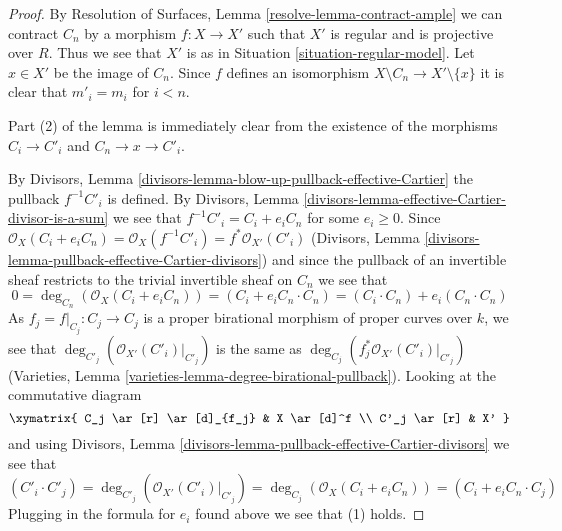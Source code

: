 \begin{proof}
By Resolution of Surfaces, Lemma \ref{resolve-lemma-contract-ample}
we can contract $C_n$ by a morphism $f : X \to X'$ such that $X'$ is
regular and is projective over $R$. Thus we see that $X'$ is as in
Situation \ref{situation-regular-model}.
Let $x \in X'$ be the image of $C_n$.
Since $f$ defines an isomorphism $X \setminus C_n \to X' \setminus \{x\}$
it is clear that $m'_i = m_i$ for $i < n$.

\medskip\noindent
Part (2) of the lemma is immediately clear from
the existence of the morphisms $C_i \to C'_i$ and $C_n \to x \to C'_i$.

\medskip\noindent
By Divisors, Lemma \ref{divisors-lemma-blow-up-pullback-effective-Cartier}
the pullback $f^{-1}C'_i$ is defined. By
Divisors, Lemma \ref{divisors-lemma-effective-Cartier-divisor-is-a-sum}
we see that $f^{-1}C'_i = C_i + e_i C_n$ for some $e_i \geq 0$. Since
$\mathcal{O}_X(C_i + e_i C_n) = \mathcal{O}_X(f^{-1}C'_i) =
f^*\mathcal{O}_{X'}(C'_i)$
(Divisors, Lemma \ref{divisors-lemma-pullback-effective-Cartier-divisors})
and since the pullback of an invertible sheaf restricts to the
trivial invertible sheaf on $C_n$ we see that
$$
0 = \deg_{C_n}(\mathcal{O}_X(C_i + e_i C_n)) =
(C_i + e_i C_n \cdot C_n) = (C_i \cdot C_n) + e_i(C_n \cdot C_n)
$$
As $f_j = f|_{C_j} : C_j \to C_j$ is a
proper birational morphism of proper curves
over $k$, we see that $\deg_{C'_j}(\mathcal{O}_{X'}(C'_i)|_{C'_j})$ is the
same as $\deg_{C_j}(f_j^*\mathcal{O}_{X'}(C'_i)|_{C'_j})$
(Varieties, Lemma \ref{varieties-lemma-degree-birational-pullback}).
Looking at the commutative diagram
$$
\xymatrix{
C_j \ar[r] \ar[d]_{f_j} & X \ar[d]^f \\
C'_j \ar[r] & X'
}
$$
and using Divisors, Lemma
\ref{divisors-lemma-pullback-effective-Cartier-divisors}
we see that
$$
(C'_i \cdot C'_j) = \deg_{C'_j}(\mathcal{O}_{X'}(C'_i)|_{C'_j}) =
\deg_{C_j}(\mathcal{O}_X(C_i + e_i C_n)) = (C_i + e_i C_n \cdot C_j)
$$
Plugging in the formula for $e_i$ found above we see that (1) holds.
\end{proof}

